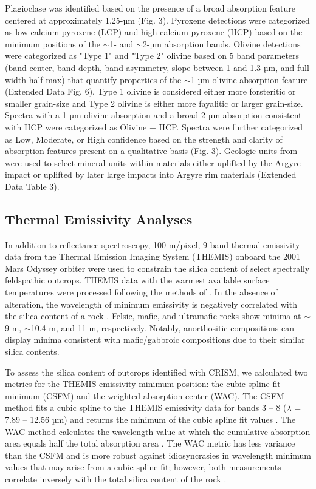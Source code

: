 \documentclass[11pt]{article}
\begin{document}
Plagioclase was identified based on the presence of a broad absorption feature centered at approximately 1.25-µm (Fig. 3). Pyroxene detections were categorized as low-calcium pyroxene (LCP) and high-calcium pyroxene (HCP) based on the minimum positions of the $\sim$1- and $\sim$2-µm absorption bands. Olivine detections were categorized as "Type 1" and "Type 2" olivine \citep{Ody2013} based on 5 band parameters (band center, band depth, band asymmetry, slope between 1 and 1.3 µm, and full width half max) that quantify properties of the $\sim$1-µm olivine absorption feature (Extended Data Fig. 6). Type 1 olivine is considered either more forsteritic or smaller grain-size and Type 2 olivine is either more fayalitic or larger grain-size. Spectra with a 1-µm olivine absorption and a broad 2-µm absorption consistent with HCP were categorized as Olivine + HCP. Spectra were further categorized as Low, Moderate, or High confidence based on the strength and clarity of absorption features present on a qualitative basis (Fig. 3). Geologic units from \citet{Dohm2015} were used to select mineral units within materials either uplifted by the Argyre impact or uplifted by later large impacts into Argyre rim materials (Extended Data Table 3).

\subsection*{Thermal Emissivity Analyses}

In addition to reflectance spectroscopy, 100 m/pixel, 9-band thermal emissivity data from the Thermal Emission Imaging System (THEMIS) onboard the 2001 Mars Odyssey orbiter \citep{Christensen2004} were used to constrain the silica content of select spectrally feldspathic outcrops. THEMIS data with the warmest available surface temperatures were processed following the methods of \citet{Bandfield2004}. In the absence of alteration, the wavelength of minimum emissivity is negatively correlated with the silica content of a rock \citep{Lyon1965}. Felsic, mafic, and ultramafic rocks show minima at $\sim$9 \textmu m, $\sim$10.4 \textmu m, and 11 \textmu m, respectively. Notably, anorthositic compositions can display minima consistent with mafic/gabbroic compositions due to their similar silica contents.

To assess the silica content of outcrops identified with CRISM, we calculated two metrics for the THEMIS emissivity minimum position: the cubic spline fit minimum (CSFM) and the weighted absorption center (WAC). The CSFM method fits a cubic spline to the THEMIS emissivity data for bands 3 -- 8 ($\lambda$ = 7.89 -- 12.56 µm) and returns the minimum of the cubic spline fit values \citep{Rogers2015}. The WAC method calculates the wavelength value at which the cumulative absorption area equals half the total absorption area \citep{Vincent1972, Smith2013, Amador2016}. The WAC metric has less variance than the CSFM and is more robust against idiosyncrasies in wavelength minimum values that may arise from a cubic spline fit; however, both measurements correlate inversely with the total silica content of the rock \citep{Vincent1972, Walter1989, Rogers2015, Amador2016}.
\end{document}
